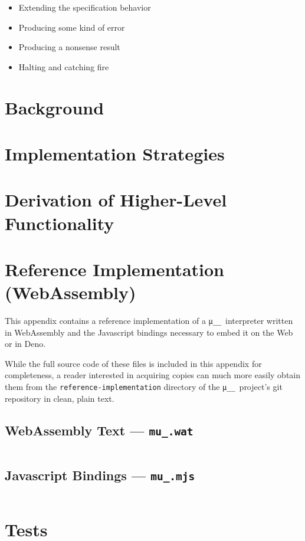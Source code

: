 \documentclass[twocolumn]{report}
\newcommand\muu{\texttt{μ\!\!\!\_\_}}
\renewcommand{\thesection}{\arabic{section}}
\begin{document}
\begin{itemize}
\item Extending the specification behavior
\item Producing some kind of error
\item Producing a nonsense result
\item Halting and catching fire
\end{itemize}



\appendix
\renewcommand{\thesection}{\thechapter.\arabic{section}}

\chapter{Background}
\label{appendix:background}

\chapter{Implementation Strategies}
\label{appendix:implementation_strategies}

\chapter{Derivation of Higher-Level Functionality}
\label{appendix:higher_level_derivation}

\chapter{Reference Implementation (WebAssembly)}
\label{appendix:reference_implementation_wasm}

This appendix contains a reference implementation of a \muu\ interpreter written
in WebAssembly and the Javascript bindings necessary to embed it on the Web or
in Deno.

While the full source code of these files is included in this appendix for
completeness, a reader interested in acquiring copies can much more easily
obtain them from the \texttt{reference-implementation} directory of
the \muu\ project's git repository in clean, plain text.

\section{WebAssembly Text --- \texttt{mu_.wat}}
\inputminted[fontsize=\fontsize{6.5pt}{6.5pt},ignorelexererrors=true]{wat}{../reference-implementation/mu_.wat}

\section{Javascript Bindings --- \texttt{mu_.mjs}}
\inputminted[fontsize=\fontsize{6.5pt}{6.5pt}]{javascript}{../reference-implementation/mu_.mjs}

\chapter{Tests}
\label{appendix:tests}
\end{document}
